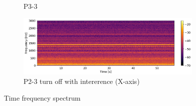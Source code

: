 \begin{figure}[h]
\begin{subfigure}[b]{0.48\textwidth}
        \caption{P3-3}
    \end{subfigure}
	\hfill
    \begin{subfigure}[b]{0.48\textwidth}
        \includegraphics[width=\textwidth]{assets/results/time-frequency-spectrum/X-P2-Turn-on-Sigma.png}
        \caption{P2-3 turn off with intererence (X-axis)}
    \end{subfigure}
    \caption{Time frequency spectrum}
\end{figure}


